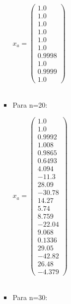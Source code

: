 \documentclass{udpreport}
\begin{document}
\begin{enumerate}
\begin{enumerate}
\begin{itemize}
 				$x_{a} = \left(\begin{array}{c} 1.0\\ 1.0\\ 1.0\\ 1.0\\ 1.0\\ 1.0\\ 0.9998\\ 1.0\\ 0.9999\\ 1.0 \end{array}\right)$
 				\\
 				\\
 				\item Para n=20:
 				
 				$x_{a} = \left(\begin{array}{c} 1.0\\ 1.0\\ 0.9992\\ 1.008\\ 0.9865\\ 0.6493\\ 4.094\\ -11.3\\ 28.09\\ -30.78\\ 14.27\\ 5.74\\ 8.759\\ -22.04\\ 9.068\\ 0.1336\\ 29.05\\ -42.82\\ 26.48\\ -4.379 \end{array}\right)$
 				\\
 				\\
 				\newpage
 				\item Para n=30:
 				

\end{itemize}
\end{enumerate}
\end{enumerate}
\end{document}

